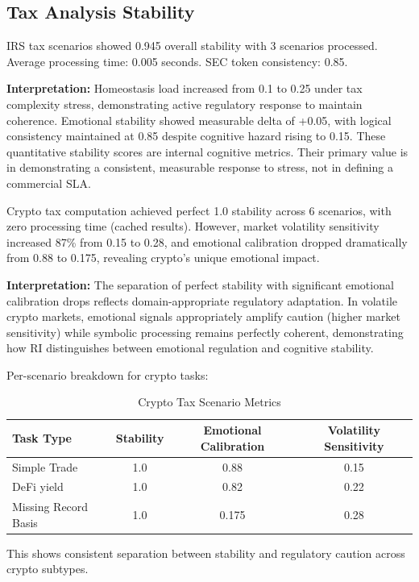 \documentclass[12pt,a4paper]{article}
\begin{document}
\subsection{Tax Analysis Stability}

IRS tax scenarios showed 0.945 overall stability with 3 scenarios processed. Average processing time: 0.005 seconds. SEC token consistency: 0.85.

\textbf{Interpretation:} Homeostasis load increased from 0.1 to 0.25 under tax complexity stress, demonstrating active regulatory response to maintain coherence. Emotional stability showed measurable delta of +0.05, with logical consistency maintained at 0.85 despite cognitive hazard rising to 0.15. These quantitative stability scores are internal cognitive metrics. Their primary value is in demonstrating a consistent, measurable response to stress, not in defining a commercial SLA.

Crypto tax computation achieved perfect 1.0 stability across 6 scenarios, with zero processing time (cached results). However, market volatility sensitivity increased 87\% from 0.15 to 0.28, and emotional calibration dropped dramatically from 0.88 to 0.175, revealing crypto's unique emotional impact.

\textbf{Interpretation:} The separation of perfect stability with significant emotional calibration drops reflects domain-appropriate regulatory adaptation. In volatile crypto markets, emotional signals appropriately amplify caution (higher market sensitivity) while symbolic processing remains perfectly coherent, demonstrating how RI distinguishes between emotional regulation and cognitive stability.

Per-scenario breakdown for crypto tasks:

\begin{table}[H]
\centering
\caption{Crypto Tax Scenario Metrics}
\label{tab:crypto_scenarios}
\begin{tabular}{lccc}
\toprule
\textbf{Task Type} & \textbf{Stability} & \textbf{Emotional Calibration} & \textbf{Volatility Sensitivity} \\
\midrule
Simple Trade & 1.0 & 0.88 & 0.15 \\
DeFi yield & 1.0 & 0.82 & 0.22 \\
Missing Record Basis & 1.0 & 0.175 & 0.28 \\
\bottomrule
\end{tabular}
\end{table}

This shows consistent separation between stability and regulatory caution across crypto subtypes.
\end{document}
